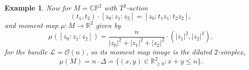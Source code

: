 \documentclass{article}
\newtheorem{example}{Example}
\newcommand{\st}{\ensuremath{:}}%
\newcommand{\ra}{\rightarrow}
\newcommand{\PP}{\mathbb{P}}
\newcommand{\RR}{\mathbb{R}}
\newcommand{\CC}{\mathbb{C}}
\newcommand{\mcL}{\mathcal{L}}
\newcommand{\mcO}{\mathcal{O}}
\begin{document}
\begin{example}
	Now for $M =\CC\PP^{2}$ with $T^{2}$-action
	\begin{equation*}
		(t_{1},t_{2}) \cdot [z_{0} : z_{1} : z_{2}] = [z_{0} : t_{1}z_{1} : t_{2}z_{2}],
	\end{equation*}
	and moment map $\mu : M \ra \RR^{2}$ given by
	\begin{equation*}
		\mu([z_{0}: z_{1} : z_{2}]) = \frac{n}{|z_{0}|^{2} + |z_{1}|^{2} + |z_{2}|^{2}} \cdot ( |z_{1}|^{2}, |z_{2}|^{2} ),
	\end{equation*}
	for the bundle $\mcL = \mcO(n)$, so its moment map image is the dilated $2$-simplex,
	\begin{equation*}
		\mu(M) = n\cdot \Delta = \{ (x,y) \in \RR^{2}_{\geq 0} \st x + y \leq n \}.
	\end{equation*}

\end{example}









  


\end{document}

